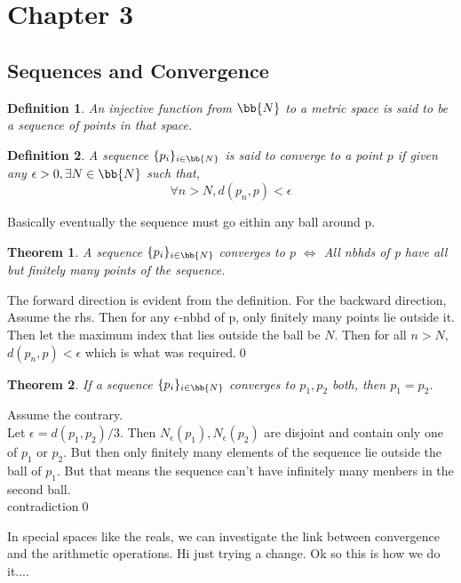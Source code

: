 \documentclass{myclass}
\newtheorem*{definition}{Definition}
\newtheorem*{theorem}{Theorem}
\begin{document}
\section*{Chapter 3}

\subsection{Sequences and Convergence}

\begin{definition}
    An injective function from $\bb{N}$ to a metric space is said to be a 
    sequence of points in that space.
\end{definition}

\begin{definition}
    A sequence $\{p_i\}_{i\in\bb{N}}$ is said to converge to a point $p$ if given any
    $\epsilon>0,\exists N\in\bb{N}$ such that,$$\forall n>N, d(p_n,p)<\epsilon$$
\end{definition}

\begin{remark}
    Basically eventually the sequence must go eithin any ball around p.
\end{remark}

\begin{theorem}
    A sequence $\{p_i\}_{i\in\bb{N}}$ converges to $p$ $\iff$ All nbhds of p have all but finitely many points of the sequence.
\end{theorem}
\begin{prf}
    The forward direction is evident from the definition. For the backward direction, Assume the rhs.
    Then for any $\epsilon$-nbhd of p, only finitely many points lie outside it. Then let the maximum index that lies outside the ball be $N$.
    Then for all $n>N$,$d(p_n,p)<\epsilon$ which is what was required.\qed
\end{prf}

\begin{theorem}
    If a sequence $\{p_i\}_{i\in\bb{N}}$ converges to $p_1,p_2$ both, then $p_1=p_2$.
\end{theorem}
\begin{prf}
    Assume the contrary.\\
    Let $\epsilon=d(p_1,p_2)/3$. Then $N_\epsilon(p_1),N_\epsilon(p_2)$ are disjoint and contain only one of $p_1$ or $p_2$.
    But then only finitely many elements of the sequence lie outside the ball of $p_1$. But that means the sequence can't have infinitely many menbers in the second ball.\\
    contradiction\qed
\end{prf}

In special spaces like the reals, we can investigate the link between convergence and the arithmetic operations.
Hi just trying a change. Ok so this is how we do it....
\end{document}
